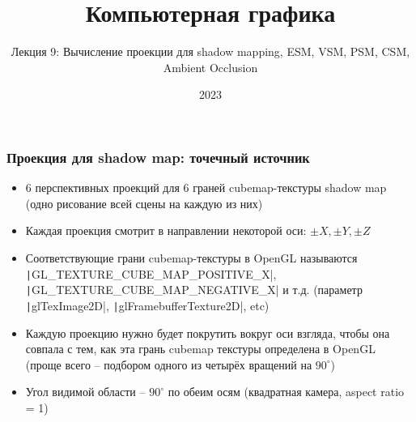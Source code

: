 \documentclass{beamer}
\title{Компьютерная графика}
\subtitle{Лекция 9: Вычисление проекции для shadow mapping, ESM, VSM, PSM, CSM, Ambient Occlusion}
\date{2023}
\begin{document}

\frame{\titlepage}

\begin{frame}[fragile]
\frametitle{Проекция для shadow map: точечный источник}
\begin{itemize}
\item 6 перспективных проекций для 6 граней cubemap-текстуры shadow map (одно рисование всей сцены на каждую из них)
\pause
\item Каждая проекция смотрит в направлении некоторой оси: \begin{math}\pm X, \pm Y, \pm Z\end{math}
\pause
\item Соответствующие грани cubemap-текстуры в OpenGL называются \texttt|GL_TEXTURE_CUBE_MAP_POSITIVE_X|, \texttt|GL_TEXTURE_CUBE_MAP_NEGATIVE_X| и т.д. (параметр \texttt|glTexImage2D|, \texttt|glFramebufferTexture2D|, etc)
\pause
\item Каждую проекцию нужно будет покрутить вокруг оси взгляда, чтобы она совпала с тем, как эта грань cubemap текстуры определена в OpenGL (проще всего -- подбором одного из четырёх вращений на \begin{math}90^\circ\end{math})
\pause
\item Угол видимой области -- \begin{math}90^\circ\end{math} по обеим осям (квадратная камера, aspect ratio = 1)
\end{itemize}
\end{frame}
\end{document}
